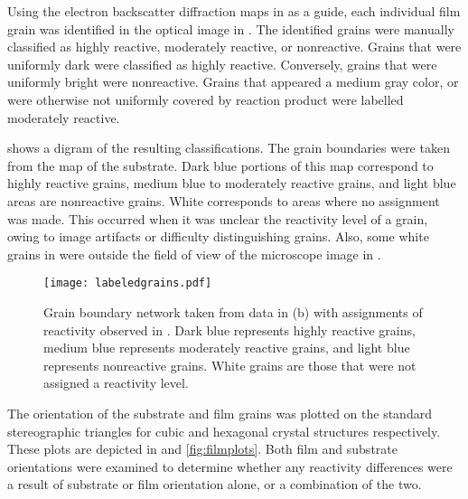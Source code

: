 Using the electron backscatter diffraction maps in  as a guide, each individual film grain was identified in the optical image in . The identified grains were manually classified as highly reactive, moderately reactive, or nonreactive. Grains that were uniformly dark were classified as highly reactive. Conversely, grains that were uniformly bright were nonreactive. Grains that appeared a medium gray color, or were otherwise not uniformly covered by reaction product were labelled moderately reactive.

 shows a digram of the resulting classifications. The grain boundaries were taken from the  map of the substrate. Dark blue portions of this map correspond to highly reactive grains, medium blue to moderately reactive grains, and light blue areas are nonreactive grains. White corresponds to areas where no assignment was made. This occurred when it was unclear the reactivity level of a grain, owing to image artifacts or difficulty distinguishing grains. Also, some white grains in  were outside the field of view of the microscope image in .
\begin{figure}
	\texttt{[image: labeledgrains.pdf]}
		\caption[Reactivity assignments for film]{%
			Grain boundary network taken from  data in 
			(b) with assignments of reactivity
			observed in . Dark blue represents 
			highly reactive grains, medium blue represents moderately
			reactive grains, and light blue represents nonreactive 
			grains. White grains are those that were not assigned a 
			reactivity level.}
	\label{fig:labeledgrains}
\end{figure}

The orientation of the substrate and film grains was plotted on the standard stereographic triangles for cubic and hexagonal crystal structures respectively. These plots are depicted in  and \ref{fig:filmplots}. Both film and substrate orientations were examined to determine whether any reactivity differences were a result of substrate or film orientation alone, or a combination of the two.

